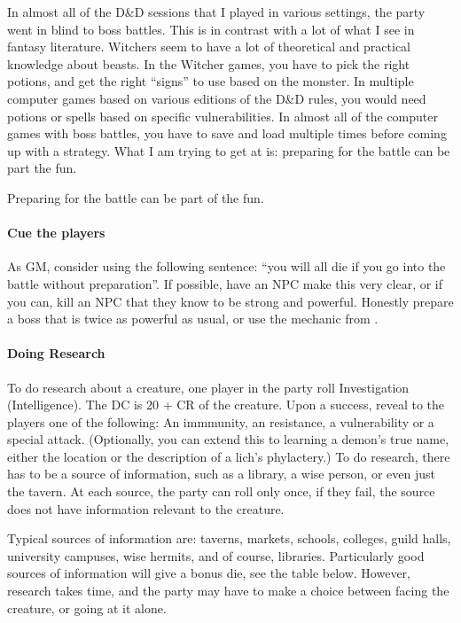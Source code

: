 \documentclass[twocolumn]{dndbook}
\begin{document}
In almost all of the D\&D sessions that I played in various settings, the party went in blind to boss battles.
This is in contrast with a lot of what I see in fantasy literature.
Witchers seem to have a lot of theoretical and practical knowledge about beasts.
In the Witcher games, you have to pick the right potions, and get the right ``signs'' to use based on the monster.
In multiple computer games based on various editions of the D\&D rules, you would need potions or spells based on specific vulnerabilities.
In almost all of the computer games with boss battles, you have to save and load multiple times before coming up with a strategy.
What I am trying to get at is: preparing for the battle can be part the fun.\par

\begin{emphasisParagraph}
	Preparing for the battle can be part of the fun.
\end{emphasisParagraph}

\paragraph*{Cue the players}
As GM, consider using the following sentence: ``you will all die if you go into the battle without preparation''.
If possible, have an NPC make this very clear, or if you can, kill an NPC that they know to be strong and powerful.
Honestly prepare a boss that is twice as powerful as usual, or use the mechanic from .\par

\paragraph*{Doing Research}

To do research about a creature, one player in the party roll Investigation (Intelligence).
The DC is 20 + CR of the creature.
Upon a success, reveal to the players one of the following: An immmunity, an resistance, a vulnerability or a special attack.
(Optionally, you can extend this to learning a demon's true name, either the location or the description of a lich's phylactery.)
To do research, there has to be a source of information, such as a library, a wise person, or even just the tavern.
At each source, the party can roll only once, if they fail, the source does not have information relevant to the creature.\par

Typical sources of information are: taverns, markets, schools, colleges, guild halls, university campuses, wise hermits, and of course, libraries.
Particularly good sources of information will give a bonus die, see the table below.
However, research takes time, and the party may have to make a choice between facing the creature, or going at it alone.\par
\end{document}
